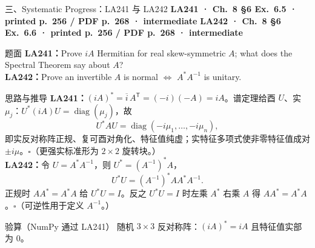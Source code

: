 \documentclass[aspectratio=169,10pt,fontset=none]{ctexbeamer}
\newcommand{\ex}[1]{\textcolor{accent}{\footnotesize\bfseries #1}}
\begin{document}
\begin{frame}[t]{三、Systematic Progress：LA241 与 LA242}
  \leavevmode\ex{LA241 · Ch.~8 §6 Ex.~6.5 · printed p.~256 / PDF p.~268 · intermediate}\quad
  \ex{LA242 · Ch.~8 §6 Ex.~6.6 · printed p.~256 / PDF p.~268 · intermediate}
  \begin{block}{\footnotesize 题面}
    \scriptsize \textbf{LA241：}Prove $iA$ Hermitian for real skew-symmetric $A$; what does the Spectral Theorem say about $A$?\\
    \textbf{LA242：}Prove an invertible $A$ is normal $\iff$ $A^*A^{-1}$ is unitary.
  \end{block}
  \begin{exampleblock}{\footnotesize 思路与推导}
    \scriptsize
    \textbf{LA241：}$(iA)^*=\overline i\,A^{\mathsf T}=(-i)(-A)=iA$。谱定理给酉 $U$、实 $\mu_j$：$U^*(iA)U=\operatorname{diag}(\mu_j)$，故
    $$U^*AU=\operatorname{diag}(-i\mu_1,\ldots,-i\mu_n),$$
    即实反对称阵正规、复可酉对角化、特征值纯虚；实特征多项式使非零特征值成对 $\pm i\mu$。$\square$（更强实标准形为 $2\times2$ 旋转块。）\\[2pt]
    \textbf{LA242：}令 $U=A^*A^{-1}$，则 $U^*=(A^{-1})^*A$，
    $$U^*U=(A^{-1})^*AA^*A^{-1}.$$
    正规时 $AA^*=A^*A$ 给 $U^*U=I$。反之 $U^*U=I$ 时左乘 $A^*$ 右乘 $A$ 得 $AA^*=A^*A$。$\square$（可逆性用于定义 $A^{-1}$。）
  \end{exampleblock}
  \begin{block}{\footnotesize 验算（NumPy 通过 LA241）}
    \scriptsize 随机 $3\times3$ 反对称阵：$(iA)^*=iA$ 且特征值实部为 0。
  \end{block}
\end{frame}
\end{document}
